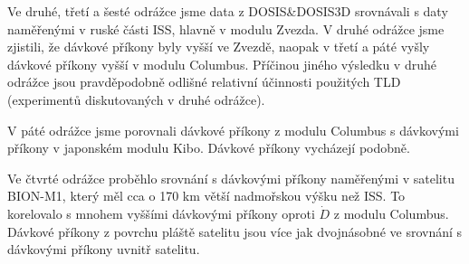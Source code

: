  Ve druhé, třetí a šesté odrážce jsme data z DOSIS\&DOSIS3D srovnávali s daty naměřenými v ruské části ISS, hlavně v modulu Zvezda. V druhé odrážce jsme zjistili, že dávkové příkony byly vyšší ve Zvezdě, naopak v třetí a páté vyšly dávkové příkony vyšší v modulu Columbus. Příčinou jiného výsledku v druhé odrážce jsou pravděpodobně odlišné relativní účinnosti použitých TLD (experimentů diskutovaných v druhé odrážce).

 V páté odrážce jsme porovnali dávkové příkony z modulu Columbus s dávkovými příkony v japonském modulu Kibo. Dávkové příkony vycházejí podobně.

 Ve čtvrté odrážce proběhlo srovnání s dávkovými příkony naměřenými v satelitu BION-M1, který měl cca o 170 km větší nadmořskou výšku než ISS. To korelovalo s mnohem vyššími dávkovými příkony oproti $\dot{D}$ z modulu Columbus. Dávkové příkony z povrchu pláště satelitu jsou více jak dvojnásobné ve srovnání s dávkovými příkony uvnitř satelitu.



